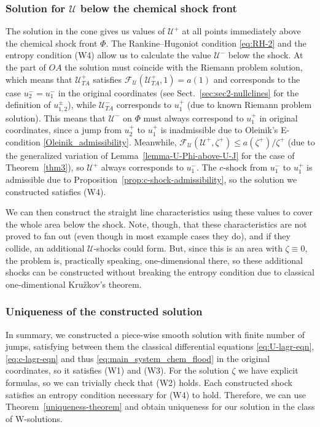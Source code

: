 \documentclass[12pt]{article}
\theoremstyle{definition}
\begin{document}
\subsubsection{Solution for $\mathcal U$ below the chemical shock front}
The solution in the cone gives us values of $\mathcal U^+$ at all points immediately above the chemical shock front $\Phi$. The Rankine--Hugoniot condition \eqref{eq:RH-2} and the entropy condition (W4) allow us to calculate the value $\mathcal U^-$ below the shock. At the part of $OA$ the solution must coincide with the Riemann problem solution, which means that $\mathcal U^+_{TA}$ satisfies $\mathcal F_{\mathcal U}(\mathcal U^+_{TA}, 1) = a(1)$ and corresponds to the case $u_2^-=u_1^-$ in the original coordinates (see Sect.~\ref{sec:sec2-nullclines} for the definition of $u_{1,2}^\pm$), while $\mathcal U^-_{TA}$ corresponds to $u^+_1$ (due to known Riemann problem solution). This means that $\mathcal U^-$ on $\Phi$ must always correspond to $u_1^+$ in original coordinates, since a jump from $u_2^+$ to $u_1^+$ is inadmissible due to Oleinik's E-condition \eqref{Oleinik_admissibility}. Meanwhile, $\mathcal F_{\mathcal U}(\mathcal U^+, \zeta^+) \leqslant a(\zeta^+)/\zeta^+$ (due to the generalized variation of Lemma~\ref{lemma-U-Phi-above-U-J} for the case of Theorem~\ref{thm3}), so $\mathcal U^+$ always corresponds to $u_1^-$. The $c$-shock from $u_1^-$ to $u_1^+$ is admissible due to Proposition~\ref{prop:c-shock-admissibility}, so the solution we constructed satisfies (W4).


We can then construct the straight line characteristics using these values to cover the whole area below the shock. Note, though, that these characteristics are not proved to fan out (even though in most example cases they do), and if they collide, an additional $\mathcal U$-shocks could form. But, since this is an area with $\zeta\equiv 0$, the problem is, practically speaking, one-dimensional there, so these additional shocks can be constructed without breaking the entropy condition due to classical one-dimentional Kru\v{z}kov's theorem.


\subsubsection{Uniqueness of the constructed solution}
In summary, we constructed a piece-wise smooth solution with finite number of jumps, satisfying between them the classical differential equations \eqref{eq:U-lagr-eqn}, \eqref{eq:c-lagr-eqn} and thus \eqref{eq:main_system_chem_flood} in the original coordinates, so it satisfies (W1) and (W3). For the solution $\zeta$ we have explicit formulas, so we can trivially check that (W2) holds. Each constructed shock satisfies an entropy condition necessary for (W4) to hold. Therefore, we can use Theorem~\ref{uniqueness-theorem} and obtain uniqueness for our solution in the class of W-solutions.
\end{document}
